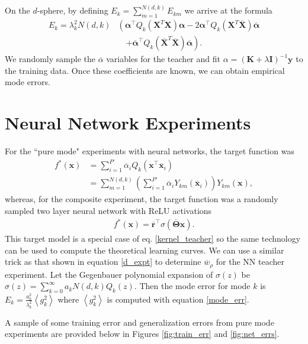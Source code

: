 \documentclass{article}
\begin{document}
On the $d$-sphere, by defining $E_k = \sum_{m=1}^{N(d,k)} E_{km}$ we arrive at the formula
%
\begin{align}
\nonumber
    E_k = \lambda_k^2 N(d,k) &\left( \bm{\alpha}^\top Q_k(\mathbf{X}^T \mathbf{X}) \bm{\alpha} 
    - 2 \bm{{\alpha}}^\top Q_k({\mathbf{X}}^T \mathbf{\overline{X}}) \bm{\overline{\alpha}}  \right.
    \\
    &\quad \left.+ \bm{\overline{\alpha}}^\top Q_k(\mathbf{\overline{X}}^T \mathbf{\overline{X}}) \bm{\overline{\alpha}}  \right).
\end{align}
%
We randomly sample the $\overline{\alpha}$ variables for the teacher and fit $\alpha = (\mathbf{K} + \lambda \mathbf{I})^{-1} \mathbf{y}$ to the training data. Once these coefficients are known, we can obtain empirical mode errors. 

\section{Neural Network Experiments}\label{SINeuralExperiment}

For the ``pure mode" experiments with neural networks, the target function was 
\begin{align}
\nonumber
     f^*(\mathbf{x}) &= \sum_{i=1}^{P'} \overline{\alpha}_i Q_k(\mathbf{x}^\top \mathbf{\overline{x}}_i) 
    \\
   & = \sum_{m=1}^{N(d,k)} \left( \sum_{i=1}^{P'} \overline{\alpha}_i  Y_{km}(\mathbf{\overline{x}}_i) \right) Y_{km}(\mathbf{x}),
\end{align}
%
whereas, for the composite experiment, the target function was a randomly sampled two layer neural network with ReLU activations 
\begin{align}
    f^*(\mathbf{x}) = \mathbf{\overline{r}}^\top \sigma( \mathbf{\overline{\Theta}} \mathbf{x}).
\end{align}
This target model is a special case of eq. \eqref{kernel_teacher} so the same technology can be used to compute the theoretical learning curves. We can use a similar trick as that shown in equation \eqref{d_expt} to determine $\overline{w}_\rho$ for the NN teacher experiment. Let the Gegenbauer polynomial expansion of $\sigma(z)$ be $\sigma(z) = \sum_{k=0}^\infty a_k N(d,k) Q_{k}(z)$.
Then the mode error for mode $k$ is $E_k = \frac{a_k^2}{\lambda_k^2} \left< g_k^2 \right>$ where $\left< g_k^2 \right>$ is computed with equation \eqref{mode_err}.

A sample of some training error and generalization errors from pure mode experiments are provided below in Figures \ref{fig:train_err} and \ref{fig:net_errs}.
\end{document}
